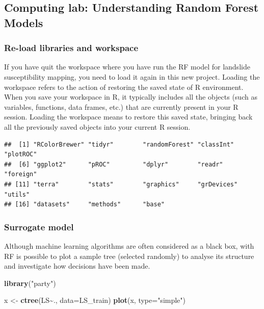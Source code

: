 \documentclass[
]{article}
\newenvironment{Shaded}{\begin{snugshade}}{\end{snugshade}}
\newcommand{\AttributeTok}[1]{\textcolor[rgb]{0.13,0.29,0.53}{#1}}
\newcommand{\FunctionTok}[1]{\textcolor[rgb]{0.13,0.29,0.53}{\textbf{#1}}}
\newcommand{\NormalTok}[1]{#1}
\newcommand{\OtherTok}[1]{\textcolor[rgb]{0.56,0.35,0.01}{#1}}
\newcommand{\SpecialCharTok}[1]{\textcolor[rgb]{0.81,0.36,0.00}{\textbf{#1}}}
\newcommand{\StringTok}[1]{\textcolor[rgb]{0.31,0.60,0.02}{#1}}
\begin{document}
\subsection{Computing lab: Understanding Random Forest Models}\label{computing-lab-understanding-random-forest-models}

\subsubsection{Re-load libraries and workspace}\label{re-load-libraries-and-workspace}

If you have quit the workspace where you have run the RF model for landslide susceptibility mapping, you need to load it again in this new project.
Loading the workspace refers to the action of restoring the saved state of R environment.
When you save your workspace in R, it typically includes all the objects (such as variables, functions, data frames, etc.) that are currently present in your R session.
Loading the workspace means to restore this saved state, bringing back all the previously saved objects into your current R session.

\begin{verbatim}
##  [1] "RColorBrewer" "tidyr"        "randomForest" "classInt"     "plotROC"     
##  [6] "ggplot2"      "pROC"         "dplyr"        "readr"        "foreign"     
## [11] "terra"        "stats"        "graphics"     "grDevices"    "utils"       
## [16] "datasets"     "methods"      "base"
\end{verbatim}

\subsubsection{Surrogate model}\label{surrogate-model}

Although machine learning algorithms are often considered as a black box, with RF is possible to plot a sample tree (selected randomly) to analyse its structure and investigate how decisions have been made.

\begin{Shaded}
\begin{Highlighting}[]
\FunctionTok{library}\NormalTok{(}\StringTok{"party"}\NormalTok{)}

\NormalTok{x }\OtherTok{\textless{}{-}} \FunctionTok{ctree}\NormalTok{(LS}\SpecialCharTok{\textasciitilde{}}\NormalTok{., }\AttributeTok{data=}\NormalTok{LS\_train)}
\FunctionTok{plot}\NormalTok{(x, }\AttributeTok{type=}\StringTok{"simple"}\NormalTok{)}
\end{Highlighting}
\end{Shaded}
\end{document}
